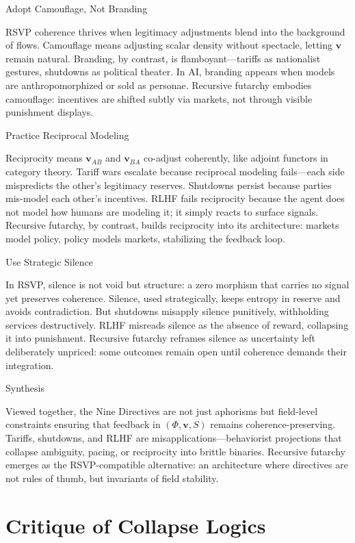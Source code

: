\documentclass{article}
\begin{document}
Adopt Camouflage, Not Branding

RSVP coherence thrives when legitimacy adjustments blend into the background of flows. Camouflage means adjusting scalar density without spectacle, letting $\mathbf{v}$ remain natural. Branding, by contrast, is flamboyant—tariffs as nationalist gestures, shutdowns as political theater. In AI, branding appears when models are anthropomorphized or sold as personae. Recursive futarchy embodies camouflage: incentives are shifted subtly via markets, not through visible punishment displays.

Practice Reciprocal Modeling

Reciprocity means $\mathbf{v}_{AB}$ and $\mathbf{v}_{BA}$ co-adjust coherently, like adjoint functors in category theory. Tariff wars escalate because reciprocal modeling fails—each side mispredicts the other’s legitimacy reserves. Shutdowns persist because parties mis-model each other’s incentives. RLHF fails reciprocity because the agent does not model how humans are modeling it; it simply reacts to surface signals. Recursive futarchy, by contrast, builds reciprocity into its architecture: markets model policy, policy models markets, stabilizing the feedback loop.

Use Strategic Silence

In RSVP, silence is not void but structure: a zero morphism that carries no signal yet preserves coherence. Silence, used strategically, keeps entropy in reserve and avoids contradiction. But shutdowns misapply silence punitively, withholding services destructively. RLHF misreads silence as the absence of reward, collapsing it into punishment. Recursive futarchy reframes silence as uncertainty left deliberately unpriced: some outcomes remain open until coherence demands their integration.

Synthesis

Viewed together, the Nine Directives are not just aphorisms but field-level constraints ensuring that feedback in $(\Phi,\mathbf{v},S)$ remains coherence-preserving. Tariffs, shutdowns, and RLHF are misapplications—behaviorist projections that collapse ambiguity, pacing, or reciprocity into brittle binaries. Recursive futarchy emerges as the RSVP-compatible alternative: an architecture where directives are not rules of thumb, but invariants of field stability.

\section{Critique of Collapse Logics}
\end{document}
